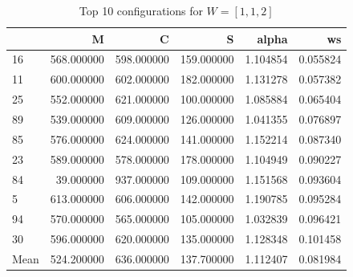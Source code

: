 \begin{frame}
    \begin{table}
        \caption{Top 10 configurations for \(W=[1,1,2]\)}
    \begin{tabular}{lrrrrr}
    \toprule
     & M & C & S & alpha & ws \\
    \midrule
    16 & 568.000000 & 598.000000 & 159.000000 & 1.104854 & 0.055824 \\
    11 & 600.000000 & 602.000000 & 182.000000 & 1.131278 & 0.057382 \\
    25 & 552.000000 & 621.000000 & 100.000000 & 1.085884 & 0.065404 \\
    89 & 539.000000 & 609.000000 & 126.000000 & 1.041355 & 0.076897 \\
    85 & 576.000000 & 624.000000 & 141.000000 & 1.152214 & 0.087340 \\
    23 & 589.000000 & 578.000000 & 178.000000 & 1.104949 & 0.090227 \\
    84 & 39.000000 & 937.000000 & 109.000000 & 1.151568 & 0.093604 \\
    5 & 613.000000 & 606.000000 & 142.000000 & 1.190785 & 0.095284 \\
    94 & 570.000000 & 565.000000 & 105.000000 & 1.032839 & 0.096421 \\
    30 & 596.000000 & 620.000000 & 135.000000 & 1.128348 & 0.101458 \\
    \midrule
    Mean & 524.200000 & 636.000000 & 137.700000 & 1.112407 & 0.081984 \\
    \bottomrule
    \end{tabular}
    \end{table}
\end{frame}

